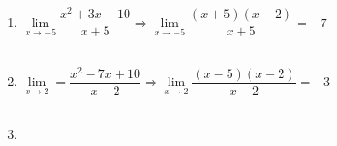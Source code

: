 \begin{enumerate}
\item $\lim\limits_{x\to -5}\dfrac{x^2 + 3x - 10}{x+5} \Longrightarrow \lim\limits_{x\to -5}\dfrac{(x+5)(x-2)}{x+5} = -7$\\\\

\item $\lim\limits_{x\to 2} = \dfrac{x^2-7x + 10}{x-2} \Longrightarrow \lim\limits_{x\to 2}\dfrac{(x-5)(x-2)}{x-2} = -3$\\\\

\item 

\end{enumerate}
